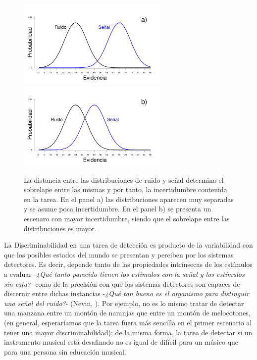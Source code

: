 \begin{figure}[h]
\centering
\includegraphics[width=0.65\textwidth]{Figures/Overlap_Small}\\ 
\includegraphics[width=0.65\textwidth]{Figures/Overlap_Big} 
\decoRule
\caption[La detección como una tarea con incertidumbre: el sobrelape entre las distribuciones]{La distancia entre las distribuciones de ruido y señal determina el sobrelape entre las mismas y por tanto, la incertidumbre contenida en la tarea. En el panel a) las distribuciones aparecen muy separadas y se asume poca incertidumbre.  En el panel b) se presenta un escenaro con mayor incertidumbre, siendo que el sobrelape entre las distribuciones es mayor.}
\label{fig:Overlap}
\end{figure}

La Discriminabilidad en una tarea de detección es producto de la variabilidad con que los posibles estados del mundo se presentan y perciben por los sistemas detectores. Es decir, depende tanto de las propiedades intrínsecas de los estímulos a evaluar -\textit{¿Qué tanto parecido tienen los estímulos con la señal y los estímulos sin esta?}- como de la precisión con que los sistemas detectores son capaces de discernir entre dichas instancias -\textit{¿Qué tan bueno es el organismo para distinguir una señal del ruido?}- (Nevin, \citeyear{Nevin1969}). Por ejemplo, no es lo mismo tratar de detectar una manzana entre un montón de naranjas que entre un montón de melocotones, (en general, esperaríamos que la tarea fuera más sencilla en el primer escenario al tener una mayor discriminabilidad); de la misma forma, la tarea de detectar si un instrumento musical está desafinado no es igual de difícil para un músico que para una persona sin educación musical.\\

